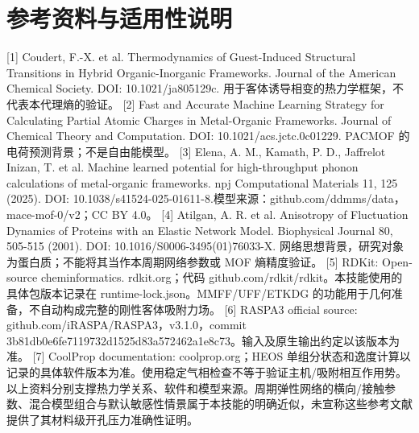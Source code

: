 \documentclass[UTF8,a4paper,11pt]{ctexart}
\begin{document}
\section*{参考资料与适用性说明}
[1] Coudert, F.-X. et al. Thermodynamics of Guest-Induced Structural Transitions in Hybrid Organic-Inorganic Frameworks. Journal of the American Chemical Society. DOI: 10.1021/ja805129c. 用于客体诱导相变的热力学框架，不代表本代理熵的验证。
[2] Fast and Accurate Machine Learning Strategy for Calculating Partial Atomic Charges in Metal-Organic Frameworks. Journal of Chemical Theory and Computation. DOI: 10.1021/acs.jctc.0c01229. PACMOF 的电荷预测背景；不是自由能模型。
[3] Elena, A. M., Kamath, P. D., Jaffrelot Inizan, T. et al. Machine learned potential for high-throughput phonon calculations of metal-organic frameworks. npj Computational Materials 11, 125 (2025). DOI: 10.1038/s41524-025-01611-8.模型来源：github.com/ddmms/data，mace-mof-0/v2；CC BY 4.0。
[4] Atilgan, A. R. et al. Anisotropy of Fluctuation Dynamics of Proteins with an Elastic Network Model. Biophysical Journal 80, 505-515 (2001). DOI: 10.1016/S0006-3495(01)76033-X. 网络思想背景，研究对象为蛋白质；不能将其当作本周期网络参数或 MOF 熵精度验证。
[5] RDKit: Open-source cheminformatics. rdkit.org；代码 github.com/rdkit/rdkit。本技能使用的具体包版本记录在 runtime-lock.json。MMFF/UFF/ETKDG 的功能用于几何准备，不自动构成完整的刚性客体吸附力场。
[6] RASPA3 official source: github.com/iRASPA/RASPA3，v3.1.0，commit 3b81db0e6fe7119732d1525d83a572462a1e8c73。输入及原生输出约定以该版本为准。
[7] CoolProp documentation: coolprop.org；HEOS 单组分状态和逸度计算以记录的具体软件版本为准。使用稳定气相检查不等于验证主机/吸附相互作用势。
以上资料分别支撑热力学关系、软件和模型来源。周期弹性网络的横向/接触参数、混合模型组合与默认敏感性情景属于本技能的明确近似，未宣称这些参考文献提供了其材料级开孔压力准确性证明。
\end{document}
